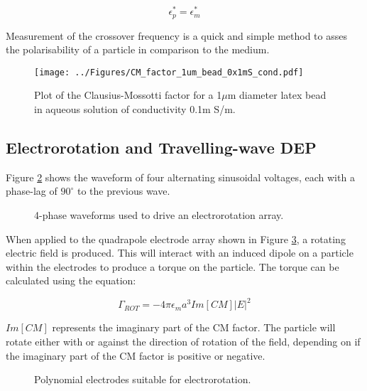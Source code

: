 \begin{equation}
 \epsilon_{p}^{*} = \epsilon_{m}^{*}
\label{eqn:crossover_equation}
\end{equation}

Measurement of the crossover frequency is a quick and simple method to asses the polarisability of a particle in comparison to the medium.

\begin{figure}
 \centering
 \texttt{[image: ../Figures/CM\_factor\_1um\_bead\_0x1mS\_cond.pdf]}
 \caption{Plot of the Clausius-Mossotti factor for a 1$\mu$m diameter latex bead in aqueous solution of conductivity 0.1m S/m.}
 \label{fig:CM_factor_1um_bead_0x1mS_cond}
\end{figure}

\subsection{Electrorotation and Travelling-wave DEP}
\label{sec:electrorotation_and_travelling_wave}

Figure \ref{fig:4_phase_sinusoidal_waveforms} shows the waveform of four alternating sinusoidal voltages, each with a phase-lag of $90^{\circ}$ to the previous wave.

\begin{figure}
 \centering
 \caption{4-phase waveforms used to drive an electrorotation array.}
 \label{fig:4_phase_sinusoidal_waveforms}
\end{figure}

When applied to the quadrapole electrode array shown in Figure \ref{fig:polynomial_electrodes_ROT}, a rotating electric field is produced. This will interact with an induced dipole on a particle within the electrodes to produce a torque on the particle. The torque can be calculated using the equation:

\begin{equation}
 \Gamma_{ROT} = -4 \pi \epsilon_{m} a^{3} Im[CM] |E|^{2}
\label{eqn:ROT_torque}
\end{equation}


$Im[CM]$ represents the imaginary part of the CM factor. The particle will rotate either with or against the direction of rotation of the field, depending on if the imaginary part of the CM factor is positive or negative.

\begin{figure}
 \centering
 \caption{Polynomial electrodes suitable for electrorotation.}
 \label{fig:polynomial_electrodes_ROT}
\end{figure}

